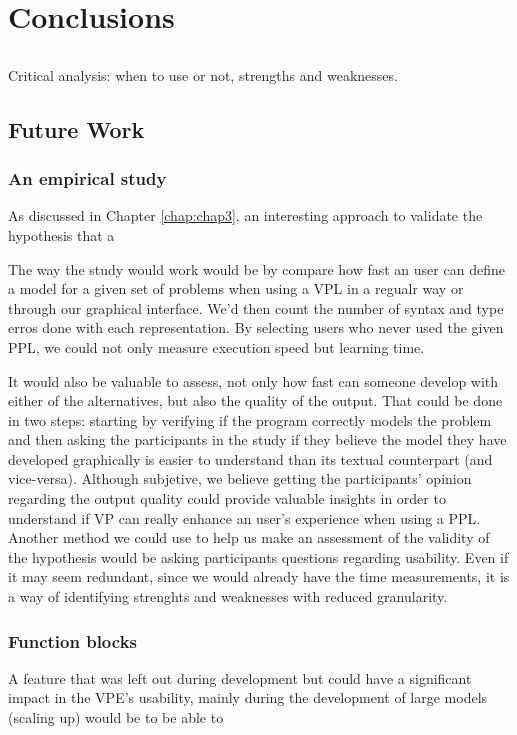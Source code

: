 \chapter{Conclusions} \label{chap:concl}

\section*{}

Critical analysis: when to use or not, strengths and weaknesses.

\section{Future Work}

\subsection{An empirical study}

As discussed in Chapter \ref{chap:chap3}, an interesting approach to validate
the hypothesis that a

The way the study would work would be by compare how fast an user can define a model for a given set of problems
when using a VPL in a regualr way or through our graphical interface. We'd then
count the number of syntax and type erros done with each representation. By
selecting users who never used the given PPL, we could not only measure execution
speed but learning time.

It would also be valuable to assess, not only how fast can someone develop with either
of the alternatives, but also the quality of the output. That could be done in two
steps: starting by verifying if the program correctly models the problem and then
asking the participants in the study if they believe the model they
have developed graphically is easier to understand than its textual counterpart (and
vice-versa).
Although subjetive, we believe getting the participants' opinion
regarding the output quality could provide valuable insights in order to understand if VP can
really enhance an user's experience when using a PPL. Another method we could use
to help us make an assessment of the validity of the hypothesis would be asking
participants questions regarding usability. Even if it may seem redundant, since
we would already have the time measurements, it is a way of identifying strenghts and
weaknesses with reduced granularity.

\subsection{Function blocks}

A feature that was left out during development but could have a significant
impact in the VPE's usability, mainly during the development of large models
(scaling up) would be to be able to 
